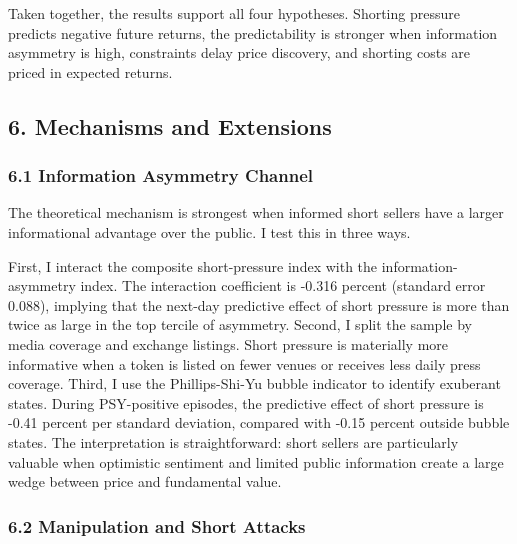 \documentclass[
]{article}
\begin{document}
Taken together, the results support all four hypotheses. Shorting
pressure predicts negative future returns, the predictability is
stronger when information asymmetry is high, constraints delay price
discovery, and shorting costs are priced in expected returns.

\subsection{6. Mechanisms and
Extensions}\label{6-mechanisms-and-extensions}

\subsubsection{6.1 Information Asymmetry
Channel}\label{61-information-asymmetry-channel}

The theoretical mechanism is strongest when informed short sellers have
a larger informational advantage over the public. I test this in three
ways.

First, I interact the composite short-pressure index with the
information-asymmetry index. The interaction coefficient is -0.316
percent (standard error 0.088), implying that the next-day predictive
effect of short pressure is more than twice as large in the top tercile
of asymmetry. Second, I split the sample by media coverage and exchange
listings. Short pressure is materially more informative when a token is
listed on fewer venues or receives less daily press coverage. Third, I
use the Phillips-Shi-Yu bubble indicator to identify exuberant states.
During PSY-positive episodes, the predictive effect of short pressure is
-0.41 percent per standard deviation, compared with -0.15 percent
outside bubble states. The interpretation is straightforward: short
sellers are particularly valuable when optimistic sentiment and limited
public information create a large wedge between price and fundamental
value.

\subsubsection{6.2 Manipulation and Short
Attacks}\label{62-manipulation-and-short-attacks}
\end{document}
